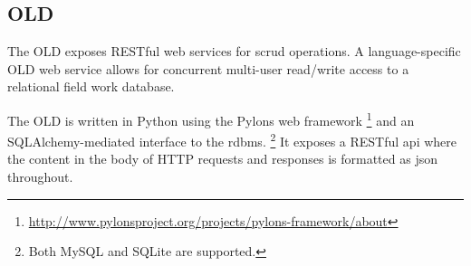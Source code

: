 \documentclass[11pt]{article}
\begin{document}
%
%

\subsection{OLD}\label{sec:old}

The OLD  exposes RESTful web services for \gls{scrud} operations. 
A language-specific OLD web service allows for concurrent
multi-user read/write access to a relational field work database. 




The OLD is written in Python using the Pylons web framework%
\footnote{\url{http://www.pylonsproject.org/projects/pylons-framework/about}} %
and an SQLAlchemy-mediated interface to the \gls{rdbms}.%
\footnote{Both MySQL and SQLite are supported.} %
It exposes a RESTful \gls{api} where the content in the body of HTTP 
requests and responses is formatted as \gls{json} throughout.%
\end{document}
